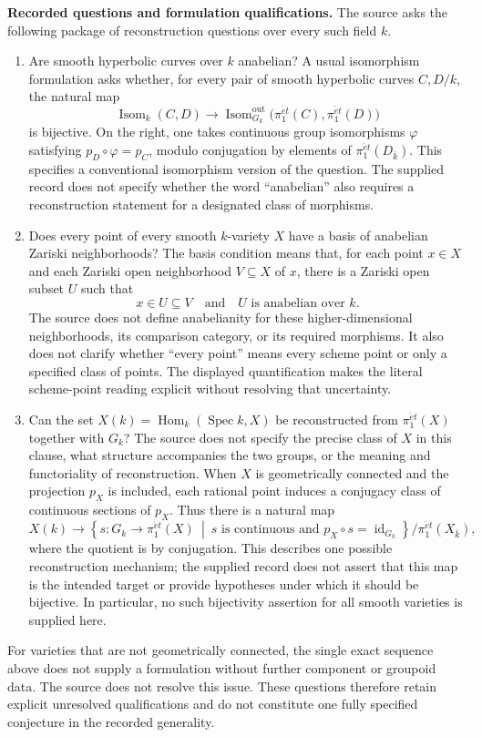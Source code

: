 \documentclass[11pt]{article}
\begin{document}
\textbf{Recorded questions and formulation qualifications.} The source asks the following package of reconstruction questions over every such field \(k\).
\begin{enumerate}
\item Are smooth hyperbolic curves over \(k\) anabelian? A usual isomorphism formulation asks whether, for every pair of smooth hyperbolic curves \(C,D/k\), the natural map
\[
\operatorname{Isom}_k(C,D)
\longrightarrow
\operatorname{Isom}^{\mathrm{out}}_{G_k}
\bigl(\pi_1^{\acute{e}t}(C),\pi_1^{\acute{e}t}(D)\bigr)
\]
is bijective. On the right, one takes continuous group isomorphisms \(\varphi\) satisfying \(p_D\circ\varphi=p_C\), modulo conjugation by elements of \(\pi_1^{\acute{e}t}(D_{\bar k})\). This specifies a conventional isomorphism version of the question. The supplied record does not specify whether the word ``anabelian'' also requires a reconstruction statement for a designated class of morphisms.
\item Does every point of every smooth \(k\)-variety \(X\) have a basis of anabelian Zariski neighborhoods? The basis condition means that, for each point \(x\in X\) and each Zariski open neighborhood \(V\subseteq X\) of \(x\), there is a Zariski open subset \(U\) such that
\[
x\in U\subseteq V
\quad\text{and}\quad U\text{ is anabelian over }k.
\]
The source does not define anabelianity for these higher-dimensional neighborhoods, its comparison category, or its required morphisms. It also does not clarify whether ``every point'' means every scheme point or only a specified class of points. The displayed quantification makes the literal scheme-point reading explicit without resolving that uncertainty.
\item Can the set \(X(k)=\operatorname{Hom}_k(\operatorname{Spec}k,X)\) be reconstructed from \(\pi_1^{\acute{e}t}(X)\) together with \(G_k\)? The source does not specify the precise class of \(X\) in this clause, what structure accompanies the two groups, or the meaning and functoriality of reconstruction. When \(X\) is geometrically connected and the projection \(p_X\) is included, each rational point induces a conjugacy class of continuous sections of \(p_X\). Thus there is a natural map
\[
X(k)\longrightarrow
\left\{s:G_k\longrightarrow\pi_1^{\acute{e}t}(X)\ \middle|\
s\text{ is continuous and }p_X\circ s=\operatorname{id}_{G_k}\right\}
\big/\pi_1^{\acute{e}t}(X_{\bar k}),
\]
where the quotient is by conjugation. This describes one possible reconstruction mechanism; the supplied record does not assert that this map is the intended target or provide hypotheses under which it should be bijective. In particular, no such bijectivity assertion for all smooth varieties is supplied here.
\end{enumerate}
For varieties that are not geometrically connected, the single exact sequence above does not supply a formulation without further component or groupoid data. The source does not resolve this issue. These questions therefore retain explicit unresolved qualifications and do not constitute one fully specified conjecture in the recorded generality.
\end{document}
